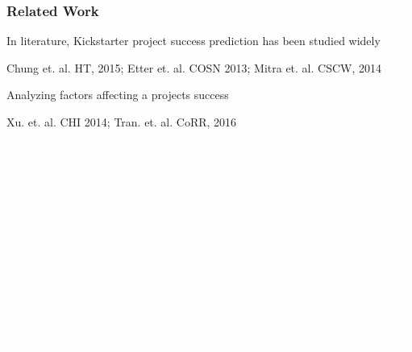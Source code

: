 \documentclass[9pt]{beamer}
\newcommand{\SubItemBlue}[1]{
	{\setlength\itemindent{15pt} \item[\color{blue}\textbullet] #1}
}
\newcommand{\SubItemWhite}[1]{
	{\setlength\itemindent{15pt} \item[\color{white}\textbullet] #1}
}
\begin{document}
\begin{frame}
	\frametitle{Related Work}
	\begin{itemize}[label=\textcolor{blue}{\textbullet}]
		\item{In literature, Kickstarter project success prediction has been studied widely}
		\SubItemBlue{\small Chung et. al. HT, 2015; Etter et. al. COSN 2013; Mitra et. al. CSCW, 2014}
		\item{ {Analyzing factors affecting a projects success}}
		\SubItemBlue{\small {Xu. et. al. CHI 2014; Tran. et. al. CoRR, 2016}}
		\item[\textcolor{white}{\textbullet}]{\textcolor{white} {Recommendation of projects to backers and investors }}
		\SubItemWhite{\small \textcolor{white} {An. et.al WWW, 2014; Rakesh et.al. WSDM, 2016; Rakesh et. al. ICWSM, 2015}}
		\item[\textcolor{white}{\textbullet}]{\textcolor{white} {Rewards delivery delay}}
		\SubItemWhite{\small \textcolor{white} {T. Tran et. al. ASONAM 2017, Y. Kim et. al. CSCW, 2017}}
		
		\item[\textcolor{white}{\textbullet}]{\textcolor{white} {Previous studies are limited to understanding projects during funding phase}}
		\vspace{10pt}
		\item[\textcolor{white}{\textbullet}]{\textcolor{white} {No study about \textit{Production Phase}}}
		
	\end{itemize}
	
	\vspace{10pt}
	\centering
	\textcolor{white} {Our work analyzes quality of crowdfunded products in market.}
	
	\vspace{10pt}
	\centering
	\textcolor{white}{Why is it important ?}
	
\end{frame}
\end{document}
